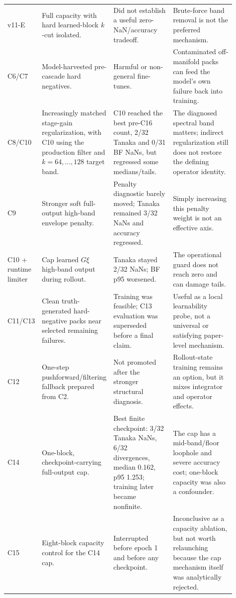 \documentclass[11pt]{article}
\begin{document}
\begin{longtable}{@{}p{0.10\linewidth}p{0.22\linewidth}p{0.29\linewidth}p{0.30\linewidth}@{}}
v11-E & Full capacity with hard learned-block \(k\)-cut isolated. & Did not
establish a useful zero-NaN/accuracy tradeoff. & Brute-force band removal is
not the preferred mechanism. \\

C6/C7 & Model-harvested pre-cascade hard negatives. & Harmful or non-general
fine-tunes. & Contaminated off-manifold packs can feed the model's own failure
back into training. \\

C8/C10 & Increasingly matched stage-gain regularization, with C10 using the
production filter and \(k=64,\ldots,128\) target band. & C10 reached the best
pre-C16 count, 2/32 Tanaka and 0/31 BF NaNs, but regressed some medians/tails. &
The diagnosed spectral band matters; indirect regularization still does not
restore the defining operator identity. \\

C9 & Stronger soft full-output high-band envelope penalty. & Penalty diagnostic
barely moved; Tanaka remained 3/32 NaNs and accuracy regressed. & Simply
increasing this penalty weight is not an effective axis. \\

C10 + runtime limiter & Cap learned \(G\xi\) high-band output during rollout. &
Tanaka stayed 2/32 NaNs; BF p95 worsened. & The operational guard does not reach
zero and can damage tails. \\

C11/C13 & Clean truth-generated hard-negative packs near selected remaining
failures. & Training was feasible; C13 evaluation was superseded before a final
claim. & Useful as a local learnability probe, not a universal or satisfying
paper-level mechanism. \\

C12 & One-step pushforward/filtering fallback prepared from C2. & Not promoted
after the stronger structural diagnosis. & Rollout-state training remains an
option, but it mixes integrator and operator effects. \\

C14 & One-block, checkpoint-carrying full-output cap. & Best finite checkpoint:
3/32 Tanaka NaNs, 6/32 divergences, median 0.162, p95 1.253; training later
became nonfinite. & The cap has a mid-band/floor loophole and severe accuracy
cost; one-block capacity was also a confounder. \\

C15 & Eight-block capacity control for the C14 cap. & Interrupted before epoch
1 and before any checkpoint. & Inconclusive as a capacity ablation, but not
worth relaunching because the cap mechanism itself was analytically rejected. \\


\end{longtable}
\end{document}
